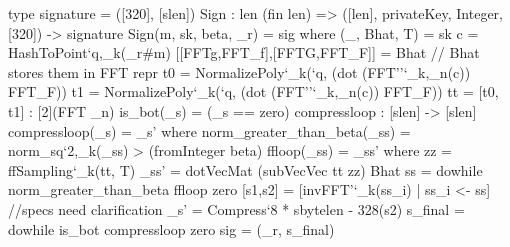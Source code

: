 
\begin{algorithm}[!htb]
	\caption{\sign(\msg, \sk, $\sqsignorm$)}\label{alg:sign}
	\begin{algorithmic}[1]
	\label{line:t}
	\Do\label{line:do}
	\Do
	\State{$\vecs = (\vect - \vecz)  \hat\matB$}
	\label{line:sqsig}
	\label{line:while}
	\end{algorithmic}
\end{algorithm}

\begin{code}
  type signature = ([320], [slen])
  Sign : {len} (fin len) => ([len], privateKey, Integer, [320]) -> signature
  Sign(m, sk, beta, _r) = sig where 
    (_, Bhat, T) = sk
    c = HashToPoint`{q,_k}(_r#m)
    [[FFTg,FFT_f],[FFTG,FFT_F]] = Bhat // Bhat stores them in FFT repr
    t0 = NormalizePoly`{_k}(`q, (dot (FFT''`{_k,_n}(c)) FFT_F))
    t1 = NormalizePoly`{_k}(`q, (dot (FFT''`{_k,_n}(c)) FFT_F))
    tt = [t0, t1] : [2](FFT _n)
    is_bot(_s) = (_s == zero)
    compressloop : [slen] -> [slen]
    compressloop(_s) = _s' where
      norm_greater_than_beta(_ss) = norm_sq`{2,_k}(_ss) > (fromInteger beta)
      ffloop(_ss) = _ss' where 
        zz = ffSampling`{_k}(tt, T)
        _ss' = dotVecMat (subVecVec tt zz) Bhat
      ss = dowhile norm_greater_than_beta ffloop zero
      [s1,s2] = [invFFT'`{_k}(ss_i) | ss_i <- ss] //specs need clarification
      _s' = Compress`{8 * sbytelen - 328}(s2)
    s_final = dowhile is_bot compressloop zero
    sig = (_r, s_final)
\end{code}

